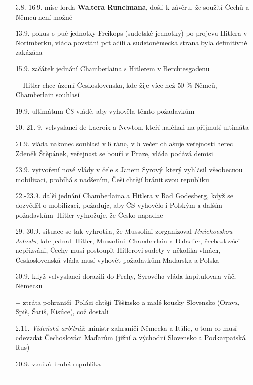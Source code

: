 \documentclass{article}
\begin{document}
\begin{itemize}
    \item[3.8.-16.9.] mise lorda \textbf{Waltera Runcimana}, došli k závěru, že soužití Čechů a Němců není možné
    \item[13.9.] pokus o puč jednotky Freikops (sudetské jednotky) po projevu Hitlera v Norimberku, vláda povstání potlačili a sudetoněmecká strana byla definitivně zakázána
    \item[15.9.] začátek jednání Chamberlaina s Hitlerem v Berchtesgadenu
    \item[$-$] Hitler chce území Československa, kde žije více než 50 \% Němců, Chamberlain souhlasí
    \item[19.9.] ultimátum ČS vládě, aby vyhověla těmto požadavkům
    \item[20.-21. 9.] velvyslanci de Lacroix a Newton, kteří naléhali na přijmutí ultimáta
    \item[21.9.] vláda nakonec souhlasí v 6 ráno, v 5 večer ohlašuje veřejnosti herec Zdeněk Štěpánek, veřejnost se bouří v Praze, vláda podává demisi
    \item[23.9.] vytvoření nové vlády v čele s Janem Syrový, který vyhlásil všeobecnou mobilizaci, probíhá s nadšením, Češi chtějí bránit svou republiku
    \item[22.-23.9.] další jednání Chamberlaina a Hitlera v Bad Godesberg, když se dozvěděl o mobilizaci, požaduje, aby ČS vyhovělo i Polským a dalším požadavkům, Hitler vyhrožuje, že Česko napadne
    \item[29.-30.9.] situace se tak vyhrotila, že Mussolini zorganizoval \textit{Mnichovskou dohodu}, kde jednali Hitler, Mussolini, Chamberlain a Daladier, čechoslováci nepřizváni, Čechy musí postoupit Hitlerovi sudety v několika vlnách, Československá vláda musí vyhovět požadavkům Maďarska a Polska
    \item[30.9.] když velvyslanci dorazili do Prahy, Syrového vláda kapitulovala vůči Německu
    \item[$-$] ztráta pohraničí, Poláci chtějí Těšínsko a malé kousky Slovensko (Orava, Spiš, Šariš, Kisúce), což dostali
    \item[2.11.] \textit{Vídeňská arbitráž}: ministr zahraničí Německa a Itálie, o tom co musí odevzdat Čechoslováci Maďarům (jižní a východní Slovensko a Podkarpatská Rus)
    \item[30.9.]  vzniká druhá republika
\end{itemize}

---
\end{document}
